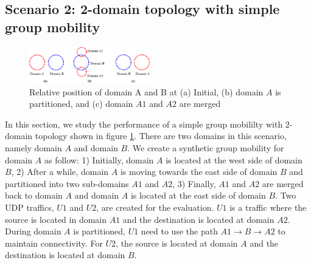 \subsection{Scenario 2: 2-domain topology with simple group mobility}
\label{sec:case2}

\begin{figure}[htb!] 
\includegraphics[width=0.47\textwidth]{figs/case2topo.eps}
\caption{Relative position of domain A and B at (a) Initial, (b) domain $A$
is partitioned, and (c) domain $A1$ and $A2$ are merged}
\label{fig:case2topo} 
\end{figure}

In this section, 
we study the performance of a simple group mobililty with 
2-domain topology shown in figure \ref{fig:case2topo}.
There are two domains in this scenario, namely domain $A$ and domain $B$. 
We create a synthetic group mobility for domain $A$ as follow: 
1) Initially, domain $A$ is located at the west side of domain $B$, 
2) After a while, domain $A$ is moving towards the east side of domain $B$ and
partitioned into two sub-domains $A1$ and $A2$,
3) Finally, $A1$ and $A2$ are merged back to domain $A$ and domain $A$ is
located at the east side of domain $B$. 
Two UDP traffics, $U1$ and $U2$, are created for the evaluation.
$U1$ is a traffic where the source is located in domain $A1$ and the destination
is located at domain $A2$. 
During domain $A$ is partitioned, $U1$ need to use the
path $A1\to B\to A2$ to maintain connectivity.
For $U2$, the source is located at domain $A$ and the destination is located at
domain $B$.

